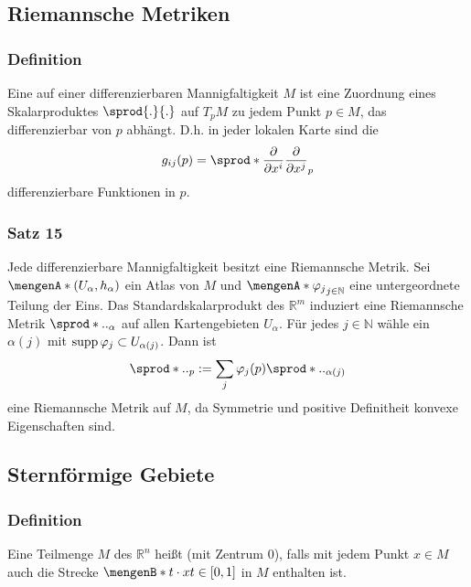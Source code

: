 \subsection{Riemannsche Metriken} %
\label{sub:32}
\subsubsection{Definition} %
\label{ssub:321}
Eine  auf einer differenzierbaren Mannigfaltigkeit $M$ ist eine Zuordnung eines Skalarproduktes $\sprod{.}{.}$ auf $T_pM$ zu jedem Punkt 
$p\in M$, das differenzierbar von $p$ abhängt. D.h. in jeder lokalen Karte sind die  
\[
	g_{ij}(p)= \sprod*{\diff{}{x^i} }{\diff{}{x^j} }_p 
\]
differenzierbare Funktionen in $p$.

\subsubsection{Satz 15} %
\label{ssub:322}
Jede differenzierbare Mannigfaltigkeit besitzt eine Riemannsche Metrik.
Sei $\set{(U_\alpha, h_\alpha)}$ ein Atlas von $M$ und $\set{\varphi_j}_{j \in \mathds{N}}$ eine untergeordnete Teilung der Eins. Das Standardskalarprodukt des 
$\mathds{R}^m$ induziert eine Riemannsche Metrik $\sprod*{.}{.}_\alpha$ auf allen Kartengebieten $U_\alpha$. Für jedes $j \in \mathds{N}$ wähle ein $\alpha(j)$ mit 
$\operatorname{supp} \varphi_j \subset U_{\alpha(j)}$. Dann ist 
\[
	\sprod*{.}{.}_p := \sum_{j} \varphi_j(p) \sprod*{.}{.}_{\alpha(j)} 
\]
eine Riemannsche Metrik auf $M$, da Symmetrie und positive Definitheit konvexe Eigenschaften sind. \bewende

\subsection{Sternförmige Gebiete} %
\label{sub:33}
\subsubsection[Definition: Sternförmiges Gebiet]{Definition} %
\label{ssub:331}
Eine Teilmenge $M$ des $\mathds{R}^n$ heißt  (mit Zentrum $0$), falls mit jedem Punkt $x \in M$ auch die Strecke $\set[t \cdot x]{t \in [0,1]}$ in $M$
enthalten ist.  

